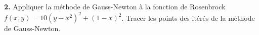 \documentclass[11pt, a4paper]{amsart}
\begin{document}
\textbf{2.} Appliquer la méthode de Gauss-Newton à la fonction de Rosenbrock
$f(x,y)=10(y-x^2)^2+(1-x)^2$. Tracer les points des itérés de la méthode
de Gauss-Newton.
%
%
%
\end{document}
